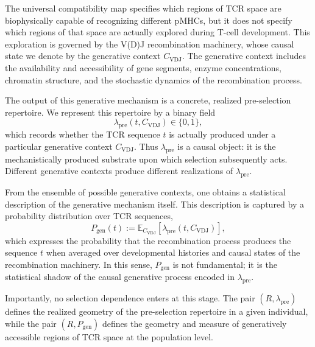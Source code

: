 \documentclass[11pt]{article}
\begin{document}

The universal compatibility map specifies which regions of TCR space are
biophysically capable of recognizing different pMHCs, but it does not specify
which regions of that space are actually explored during T-cell development.  
This exploration is governed by the V(D)J recombination machinery, whose causal
state we denote by the generative context \(C_{\mathrm{VDJ}}\).  
The generative context includes the availability and accessibility of gene
segments, enzyme concentrations, chromatin structure, and the stochastic
dynamics of the recombination process.

The output of this generative mechanism is a concrete,
realized pre-selection repertoire.  We represent this repertoire by a binary
field
\[
  \lambda_{\mathrm{pre}}(t, C_{\mathrm{VDJ}}) \in \{0,1\},
\]
which records whether the TCR sequence \(t\) is actually produced under a
particular generative context \(C_{\mathrm{VDJ}}\).  
Thus \(\lambda_{\mathrm{pre}}\) is a causal object: it is the mechanistically
produced substrate upon which selection subsequently acts.  
Different generative contexts produce different realizations of
\(\lambda_{\mathrm{pre}}\).

From the ensemble of possible generative contexts, one obtains a statistical
description of the generative mechanism itself.  
This description is captured by a probability distribution over TCR sequences,
\[
  P_{\mathrm{gen}}(t)
  :=
  \mathbb{E}_{C_{\mathrm{VDJ}}}\!\left[
     \lambda_{\mathrm{pre}}(t, C_{\mathrm{VDJ}})
  \right],
\]
which expresses the probability that the recombination process produces the
sequence \(t\) when averaged over developmental histories and causal states of
the recombination machinery.  
In this sense, \(P_{\mathrm{gen}}\) is not fundamental; it is the statistical
shadow of the causal generative process encoded in \(\lambda_{\mathrm{pre}}\).


Importantly, no selection dependence enters at this stage.  
The pair \((R, \lambda_{\mathrm{pre}})\) defines the realized geometry of the
pre-selection repertoire in a given individual, while the pair
\((R, P_{\mathrm{gen}})\) defines the geometry and measure of generatively
accessible regions of TCR space at the population level.  
\end{document}
